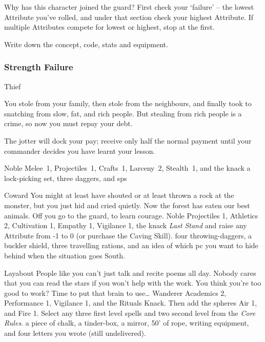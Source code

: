 \begin{multicols}{2}

\noindent
Why has this character joined the \gls{guard}?
First check your `failure' -- the lowest Attribute you've rolled, and under that section check your highest Attribute.
If multiple Attributes compete for lowest or highest, stop at the first.

Write down the concept, code, stats and equipment.

\subsubsection{Strength Failure}

\begin{itemize}

    {Thief}%
    {
      You stole from your family, then stole from the neighbours, and finally took to snatching from slow, fat, and rich people.
      But stealing from rich people is a crime, so now you must repay your debt.

      The \gls{jotter} will dock your pay; receive only half the normal payment until your commander decides you have learnt your lesson.

    }%
    {Noble}%
    {Melee~1, Projectiles~1, Crafts~1, Larceny~2, Stealth~1, and the knack }%
    {a lock-picking set, three daggers, and  \glspl{sp}}%

    {Coward}%
    {
      You might at least have shouted or at least thrown a rock at the \gls{monster}, but you just hid and cried quietly.
      Now the forest has eaten our best animals.
      Off you go to the \gls{guard}, to learn courage.
    }%
    {Noble}%
    {
      Projectiles 1, Athletics 2, Cultivation 1, Empathy 1, Vigilance 1, the knack \textit{Last Stand} and raise any Attribute from -1 to 0 (or purchase the Caving Skill).
    }%
    {
      four throwing-daggers, a buckler shield, three travelling \glspl{ration}, and an idea of which \gls{pc} you want to hide behind when the situation goes South.
    }%


    {Layabout}%
    {
      People like you can't just talk and recite poems all day.
      Nobody cares that you can read the stars if you won't help with the work.
      You think you're too good to work?
      Time to put that brain to use\ldots
    }%
    {Wanderer}%
    {%
      Academics 2, Performance 1, Vigilance 1, and the Rituals Knack.
    Then add the \glspl{sphere} Air 1, and Fire 1.
    Select any three first level spells and two second level from the \textit{Core Rules}\iftoggle{core}{, pages \pageref{fireSpells} and \pageref{lightSpells}}{}.
    }%
    {
      a piece of chalk, a tinder-box, a mirror, 50' of rope, writing equipment, and four letters you wrote (still undelivered).
    }%


\end{itemize}
\end{multicols}
